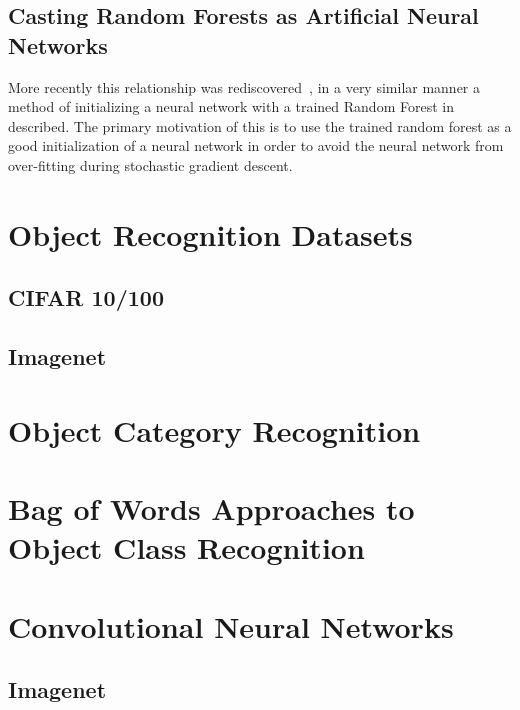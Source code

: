 \documentclass[thesis]{subfiles}
\begin{document}
\subsection{Casting Random Forests as Artificial Neural Networks}
More recently this relationship was rediscovered~\cite{Welbl2014casting}, in a very similar manner a method of initializing a neural network with a trained Random Forest in described. The primary motivation of this is to use the trained random forest as a good initialization of a neural network in order to avoid the neural network from over-fitting during stochastic gradient descent.

\section{Object Recognition Datasets}
\subsection{CIFAR 10/100}
\subsection{Imagenet}

\section{Object Category Recognition}
\section[Bag of Words]{Bag of Words Approaches to Object Class Recognition}

\section{Convolutional Neural Networks}
\subsection{Imagenet}
\end{document}
